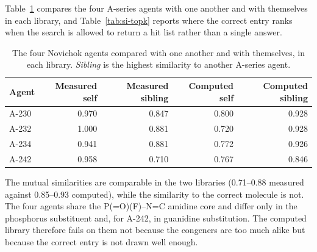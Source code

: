 \documentclass[11pt]{article}
\begin{document}
Table~\ref{tab:si-nov} compares the four A-series agents with one another and with
themselves in each library, and Table~\ref{tab:si-topk} reports where the correct entry
ranks when the search is allowed to return a hit list rather than a single answer.

\begin{table}[htbp]
\centering
\caption{The four Novichok agents compared with one another and with themselves, in each library. \emph{Sibling} is the highest similarity to another A-series agent.}
\label{tab:si-nov}
\small
\begin{tabular}{lrrrr}
\toprule
Agent & Measured self & Measured sibling & Computed self & Computed sibling \\
\midrule
A-230 & 0.970 & 0.847 & 0.800 & 0.928 \\
A-232 & 1.000 & 0.881 & 0.720 & 0.928 \\
A-234 & 0.941 & 0.881 & 0.772 & 0.926 \\
A-242 & 0.958 & 0.710 & 0.767 & 0.846 \\
\bottomrule
\end{tabular}

\begin{flushleft}\footnotesize The mutual similarities are comparable in the two libraries (0.71--0.88 measured against 0.85--0.93 computed), while the similarity to the correct molecule is not. The four agents share the P(=O)(F)--N=C amidine core and differ only in the phosphorus substituent and, for A-242, in guanidine substitution. The computed library therefore fails on them not because the congeners are too much alike but because the correct entry is not drawn well enough.\end{flushleft}
\end{table}
\clearpage
\end{document}
